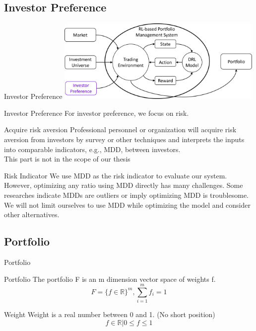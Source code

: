 \subsection{Investor Preference}
\begin{frame}{Investor Preference}
\centering
\includegraphics[width=10cm]{images/investor_preference.png}
\end{frame}

\begin{frame}{Investor Preference}
For investor preference, we focus on risk.
\begin{block}{Acquire risk aversion}
Professional personnel or organization will acquire risk aversion from investors by survey or other techniques and interprets the inputs into comparable indicators, e.g., MDD, between investors.
\\
\alert{This part is not in the scope of our thesis}
\end{block}
\begin{block}{Risk Indicator}
We use MDD as the risk indicator to evaluate our system. However, optimizing any ratio using MDD directly has many challenges. Some researches indicate MDDs are outliers or imply optimizing MDD is troublesome. 
\\
\alert{We will not limit ourselves to use MDD while optimizing the model and consider other alternatives.}
\end{block}
\end{frame}



\subsection{Portfolio}
\begin{frame}{Portfolio}
\begin{block}{Portfolio}
The portfolio F is an m dimension vector space of weights f.
\[
    F = \{ {f \in \mathbb{R} } \} ^m,
    \sum_{i=1}^m {f_i} =1
\]
\end{block}
\begin{block}{Weight}
Weight is a real number between 0 and 1. \alert{(No short position)}
\[
    f \in \mathbb{R} | 0 \leq f \leq 1 
\]
\end{block}
\end{frame}
